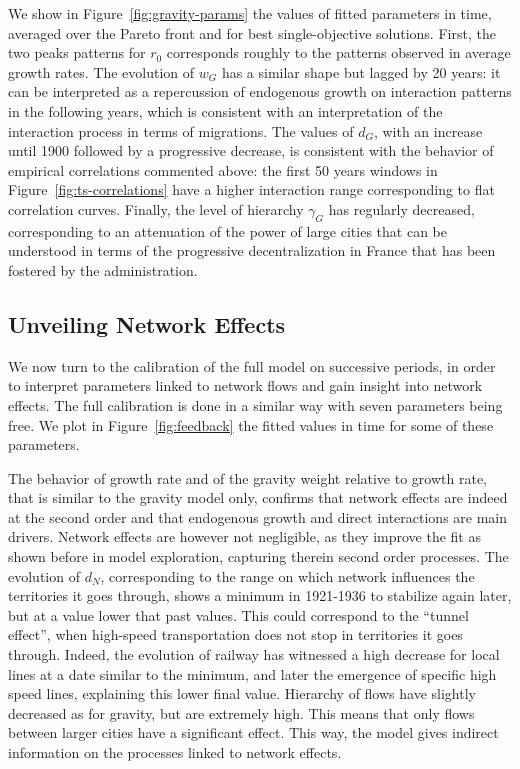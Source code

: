 \documentclass{article}
\begin{document}
We show in Figure~\ref{fig:gravity-params} the values of fitted parameters in time, averaged over the Pareto front and for best single-objective solutions. First, the two peaks patterns for $r_0$ corresponds roughly to the patterns observed in average growth rates. The evolution of $w_G$ has a similar shape but lagged by 20 years: it can be interpreted as a repercussion of endogenous growth on interaction patterns in the following years, which is consistent with an interpretation of the interaction process in terms of migrations. The values of $d_G$, with an increase until 1900 followed by a progressive decrease, is consistent with the behavior of empirical correlations commented above: the first 50 years windows in Figure~\ref{fig:ts-correlations} have a higher interaction range corresponding to flat correlation curves. Finally, the level of hierarchy $\gamma_G$ has regularly decreased, corresponding to an attenuation of the power of large cities that can be understood in terms of the progressive decentralization in France that has been fostered by the administration.





\subsection*{Unveiling Network Effects}

We now turn to the calibration of the full model on successive periods, in order to interpret parameters linked to network flows and gain insight into network effects. The full calibration is done in a similar way with seven parameters being free. We plot in Figure~\ref{fig:feedback} the fitted values in time for some of these parameters.

The behavior of growth rate and of the gravity weight relative to growth rate, that is similar to the gravity model only, confirms that network effects are indeed at the second order and that endogenous growth and direct interactions are main drivers. Network effects are however not negligible, as they improve the fit as shown before in model exploration, capturing therein second order processes. The evolution of $d_N$, corresponding to the range on which network influences the territories it goes through, shows a minimum in 1921-1936 to stabilize again later, but at a value lower that past values. This could correspond to the ``tunnel effect'', when high-speed transportation does not stop in territories it goes through. Indeed, the evolution of railway has witnessed a high decrease for local lines at a date similar to the minimum, and later the emergence of specific high speed lines, explaining this lower final value. Hierarchy of flows have slightly decreased as for gravity, but are extremely high. This means that only flows between larger cities have a significant effect. This way, the model gives indirect information on the processes linked to network effects.
\end{document}
